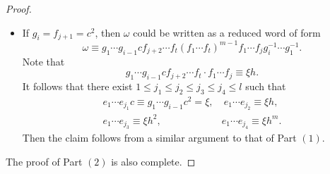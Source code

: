 \documentclass{amsart}
\theoremstyle{plain}
\theoremstyle{definition}
\theoremstyle{remark}
\begin{document}
\begin{proof}
\begin{itemize}
        \item If $g_i=f_{j+1}=c^2$, then $\omega$ could be written as a reduced word of form 
        $$\omega\equiv g_1\cdots g_{i-1}cf_{j+2}\cdots f_t\left(f_1\cdots f_t\right)^{m-1}f_1\cdots f_j g_i^{-1}\cdots g_1^{-1}.$$
        Note that
        \[ g_1\cdots g_{i-1}cf_{j+2}\cdots f_t \cdot f_1\cdots f_j \equiv \xi h.\]
        It follows that there exist $1\leq j_1\leq j_2\leq j_3\leq j_4\leq l$ such that
        $$\begin{matrix}e_1\cdots e_{j_1}c\equiv g_1\cdots g_{i-1}c^2= \xi, & \ e_1\cdots e_{j_2}\equiv \xi h,
        \\
        e_1\cdots e_{j_3}\equiv \xi h^2, & e_1\cdots e_{j_4}\equiv \xi h^m.\end{matrix}$$
        Then the claim follows from a similar argument to that of Part $(1)$.
        \end{itemize}
        
        The proof of Part $(2)$ is also complete.
    \end{proof}
   
\end{document}
